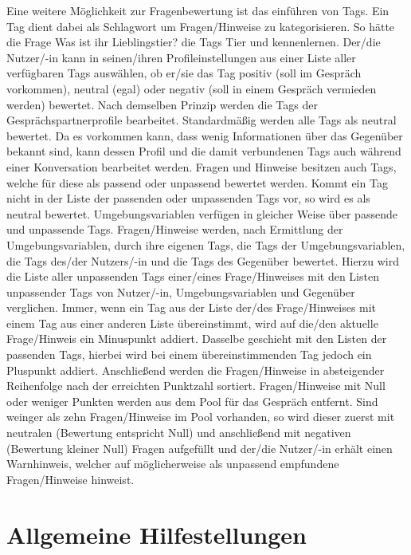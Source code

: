 Eine weitere Möglichkeit zur Fragenbewertung ist das einführen von \glqq{}Tags\grqq{}. Ein Tag dient dabei als Schlagwort um Fragen/Hinweise zu kategorisieren. So hätte die Frage
\glqq{}Was ist ihr Lieblingstier?\grqq{} die Tags \glqq{}Tier\grqq{} und \glqq{}kennenlernen\grqq{}. Der/die Nutzer/-in kann in seinen/ihren Profileinstellungen aus einer Liste aller verfügbaren
Tags auswählen, ob er/sie das Tag positiv (soll im Gespräch vorkommen), neutral (egal) oder negativ (soll in einem Gespräch vermieden werden) bewertet. Nach demselben Prinzip werden
die Tags der Gesprächspartnerprofile bearbeitet. Standardmäßig werden alle Tags als neutral bewertet. Da es vorkommen kann, dass wenig Informationen über das Gegenüber bekannt sind,
kann dessen Profil und die damit verbundenen Tags auch während einer Konversation bearbeitet werden. \newline
Fragen und Hinweise besitzen auch Tags, welche für diese als passend oder unpassend bewertet werden.  Kommt ein Tag nicht in der Liste der passenden oder unpassenden Tags vor, so
wird es als neutral bewertet. Umgebungsvariablen verfügen in gleicher Weise über passende und unpassende Tags. \newline
Fragen/Hinweise werden, nach Ermittlung der Umgebungsvariablen, durch ihre eigenen Tags, die Tags der Umgebungsvariablen, die Tags des/der Nutzers/-in und die Tags des Gegenüber
bewertet. Hierzu wird die Liste aller unpassenden Tags einer/eines Frage/Hinweises mit den Listen unpassender Tags von Nutzer/-in, Umgebungsvariablen und Gegenüber verglichen. Immer,
wenn ein Tag aus der Liste der/des Frage/Hinweises mit einem Tag aus einer anderen Liste übereinstimmt, wird auf die/den aktuelle Frage/Hinweis ein Minuspunkt addiert. Dasselbe
geschieht mit den Listen der passenden Tags, hierbei wird bei einem übereinstimmenden Tag jedoch ein Pluspunkt addiert. Anschließend werden die Fragen/Hinweise in absteigender Reihenfolge nach der
erreichten Punktzahl sortiert. Fragen/Hinweise mit Null oder weniger Punkten werden aus dem Pool für das Gespräch entfernt. Sind weinger als zehn Fragen/Hinweise im Pool vorhanden, so
wird dieser zuerst mit \glqq{}neutralen\grqq{} (Bewertung entspricht Null) und anschließend mit \glqq{}negativen\grqq{} (Bewertung kleiner Null) Fragen aufgefüllt und der/die Nutzer/-in
erhält einen Warnhinweis, welcher auf möglicherweise als unpassend empfundene Fragen/Hinweise hinweist.


\section{Allgemeine Hilfestellungen}
\label{sec:allgemeine_hilfestellungen}

